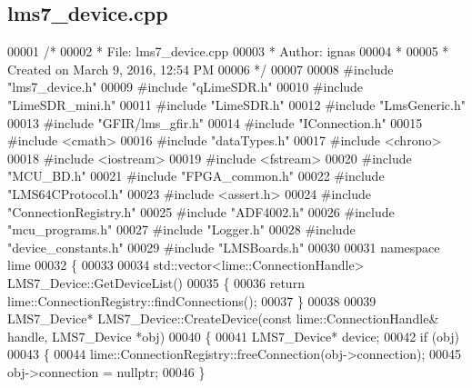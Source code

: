 \subsection{lms7\+\_\+device.\+cpp}
\label{lms7__device_8cpp_source}

\begin{DoxyCode}
00001 \textcolor{comment}{/*}
00002 \textcolor{comment}{ * File:   lms7\_device.cpp}
00003 \textcolor{comment}{ * Author: ignas}
00004 \textcolor{comment}{ *}
00005 \textcolor{comment}{ * Created on March 9, 2016, 12:54 PM}
00006 \textcolor{comment}{ */}
00007 
00008 \textcolor{preprocessor}{#include "lms7_device.h"}
00009 \textcolor{preprocessor}{#include "qLimeSDR.h"}
00010 \textcolor{preprocessor}{#include "LimeSDR_mini.h"}
00011 \textcolor{preprocessor}{#include "LimeSDR.h"}
00012 \textcolor{preprocessor}{#include "LmsGeneric.h"}
00013 \textcolor{preprocessor}{#include "GFIR/lms_gfir.h"}
00014 \textcolor{preprocessor}{#include "IConnection.h"}
00015 \textcolor{preprocessor}{#include <cmath>}
00016 \textcolor{preprocessor}{#include "dataTypes.h"}
00017 \textcolor{preprocessor}{#include <chrono>}
00018 \textcolor{preprocessor}{#include <iostream>}
00019 \textcolor{preprocessor}{#include <fstream>}
00020 \textcolor{preprocessor}{#include "MCU_BD.h"}
00021 \textcolor{preprocessor}{#include "FPGA_common.h"}
00022 \textcolor{preprocessor}{#include "LMS64CProtocol.h"}
00023 \textcolor{preprocessor}{#include <assert.h>}
00024 \textcolor{preprocessor}{#include "ConnectionRegistry.h"}
00025 \textcolor{preprocessor}{#include "ADF4002.h"}
00026 \textcolor{preprocessor}{#include "mcu_programs.h"}
00027 \textcolor{preprocessor}{#include "Logger.h"}
00028 \textcolor{preprocessor}{#include "device_constants.h"}
00029 \textcolor{preprocessor}{#include "LMSBoards.h"}
00030 
00031 \textcolor{keyword}{namespace }lime
00032 \{
00033 
00034 std::vector<lime::ConnectionHandle> LMS7_Device::GetDeviceList()
00035 \{
00036     \textcolor{keywordflow}{return} lime::ConnectionRegistry::findConnections();
00037 \}
00038 
00039 LMS7_Device* LMS7_Device::CreateDevice(\textcolor{keyword}{const} lime::ConnectionHandle& handle, 
      LMS7_Device *obj)
00040 \{
00041     LMS7_Device* device;
00042     \textcolor{keywordflow}{if} (obj)
00043     \{
00044         lime::ConnectionRegistry::freeConnection(obj->connection);
00045         obj->connection = \textcolor{keyword}{nullptr};
00046     \}

\end{DoxyCode}
